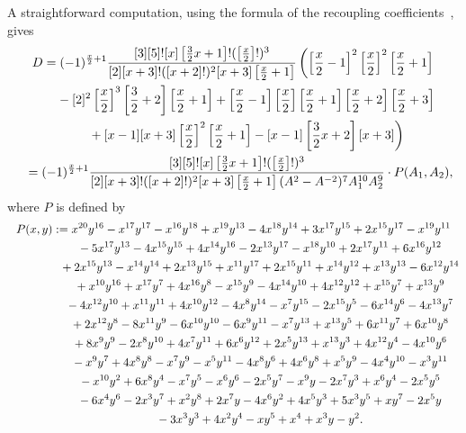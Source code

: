 A straightforward computation, using the formula of the recoupling coefficients~\cite{MV}, gives
\begin{gather*}
D = (-1)^{\frac{x}{2}+1}\frac{[3][5]![x] \left[\frac{3}{2}x+1 \right]!(\left[\frac{x}{2}\right]!)^3}{[2][x+3]!([x+2]!)^2[x+3] \left[\frac{x}{2}+1\right]}
\left( \left[\frac{x}{2}-1\right]^2 \left[\frac{x}{2}\right]^2\left[\frac{x}{2}+1\right] \right.\\
\hphantom{D =}{} - [2]^2\left[\frac{x}{2}\right]^3\left[\frac{3}{2}+2\right] \left[\frac{x}{2}+1\right] + \left[\frac{x}{2}-1\right]\left[\frac{x}{2}\right] \left[\frac{x}{2}+1\right] \left[\frac{x}{2}+2\right] \left[\frac{x}{2}+3\right]\\
\left.\hphantom{D =}{} + [x-1][x+3] \left[\frac{x}{2}\right]^2\left[\frac{x}{2}+1\right] - [x-1]\left[\frac{3}{2}x+2\right][x+3] \right) \\
\hphantom{D}{} = (-1)^{\frac{x}{2}+1}\frac{[3][5]![x]\left[\frac{3}{2}x+1\right]!(\left[\frac{x}{2}\right]!)^3}{[2][x+3]!([x+2]!)^2[x+3]\left[\frac{x}{2}+1\right](A^2-A^{-2})^7A_1^{10}A_2^{9}}\cdot P(A_1,A_2),
\end{gather*}
where $P$ is defined by
\begin{gather*}
P(x,y):= x^{20}y^{16}-x^{17}y^{17}-x^{16}y^{18}+x^{19}y^{13}-4x^{18}y^{14}+3x^{17}y^{15}+2x^{15}y^{17}-x^{19}y^{11}\\
\hphantom{P(x,y):=}{} -5x^{17}y^{13}-4x^{15}y^{15}+4x^{14}y^{16}-2x^{13}y^{17}-x^{18}y^{10} +2x^{17}y^{11}+6x^{16}y^{12} \\
\hphantom{P(x,y):=}{}+2x^{15}y^{13}-x^{14}y^{14}+2x^{13}y^{15}+x^{11}y^{17}+2x^{15}y^{11} +x^{14}y^{12}+x^{13}y^{13}-6x^{12}y^{14} \\
\hphantom{P(x,y):=}{}+x^{10}y^{16}+x^{17}y^7+4x^{16}y^8-x^{15}y^9-4x^{14}y^{10}+4x^{12}y^{12}+x^{15}y^7+x^{13}y^9 \\
\hphantom{P(x,y):=}{}-4x^{12}y^{10}+x^{11}y^{11}+4x^{10}y^{12}-4x^8y^{14}-x^7y^{15}-2x^{15}y^5-6x^{14}y^6-4x^{13}y^7 \\
\hphantom{P(x,y):=}{}+2x^{12}y^8 -8x^{11}y^9-6x^{10}y^{10}-6x^9y^{11}-x^7y^{13} +x^{13}y^5+6x^{11}y^7+6x^{10}y^8 \\
\hphantom{P(x,y):=}{}+8x^9y^9-2x^8y^{10}+4x^7y^{11}+6x^6y^{12}+2x^5y^{13}+x^{13}y^3+4x^{12}y^4 -4x^{10}y^6 \\
\hphantom{P(x,y):=}{}-x^9y^7+4x^8y^8 -x^7y^9-x^5y^{11}-4x^8y^6+4x^6y^8+x^5y^9-4x^4y^{10}-x^3y^{11} \\
\hphantom{P(x,y):=}{}-x^{10}y^2+6x^8y^4-x^7y^5-x^6y^6-2x^5y^7-x^9y-2x^7y^3 +x^6y^4-2x^5y^5\\
\hphantom{P(x,y):=}{}-6x^4y^6-2x^3y^7+x^2y^8+2x^7y-4x^6y^2+4x^5y^3+5x^3y^5+xy^7-2x^5y\\
\hphantom{P(x,y):=}{}-3x^3y^3+4x^2y^4-xy^5+x^4+x^3y-y^2.
\end{gather*}

